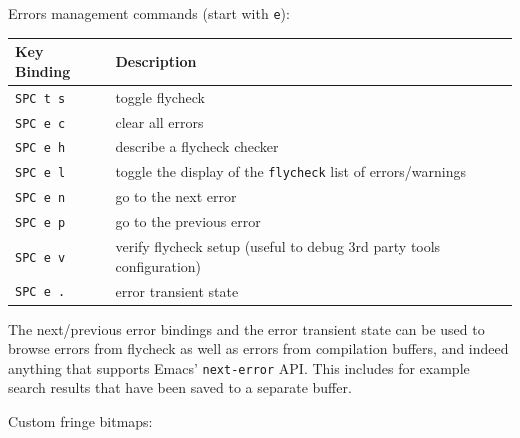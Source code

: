 \documentclass[11pt]{article}
\begin{document}
Errors management commands (start with \texttt{e}):

\begin{center}
\begin{tabular}{ll}
Key Binding & Description\\
\hline
\texttt{SPC t s} & toggle flycheck\\
\texttt{SPC e c} & clear all errors\\
\texttt{SPC e h} & describe a flycheck checker\\
\texttt{SPC e l} & toggle the display of the \texttt{flycheck} list of errors/warnings\\
\texttt{SPC e n} & go to the next error\\
\texttt{SPC e p} & go to the previous error\\
\texttt{SPC e v} & verify flycheck setup (useful to debug 3rd party tools configuration)\\
\texttt{SPC e .} & error transient state\\
\end{tabular}
\end{center}

The next/previous error bindings and the error transient state can be used to
browse errors from flycheck as well as errors from compilation buffers, and
indeed anything that supports Emacs’ \texttt{next-error} API. This includes for example
search results that have been saved to a separate buffer.

Custom fringe bitmaps:
\end{document}
